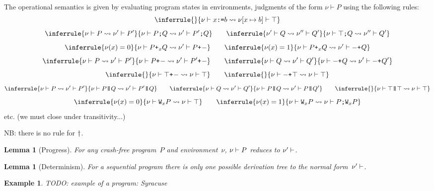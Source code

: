 \documentclass[a4paper]{article}
\theoremstyle{theorem}
\newtheorem{lemma}[theorem]{Lemma}
\theoremstyle{example}
\newtheorem{example}[theorem]{Example}
\theoremstyle{remark}
\begin{document}
The operational semantics is given by evaluating program states in environments,
\ie judgments of the form $\nu\vdash P$ using the following rules:
\[
  \inferrule{\null}{\penv{\nu}{\pset xb}\redto\penv{\nu[x\mapsto b]}{\pskip}}
\]
\[
  \inferrule{\penv\nu P\redto\penv{\nu'}{P'}}{\penv{\nu}{\pseq PQ}\redto\penv{\nu'}{\pseq{P'}{Q}}}
  \qquad
  \inferrule{\penv{\nu'}{Q}\redto\penv{\nu''}{Q'}}{\penv{\nu}{\pseq \pskip Q}\redto\penv{\nu''}{Q'}}
\]
\[
  \inferrule{\nu(x)=\Bfalse}{\penv{\nu}{\por xPQ}\redto\penv{\nu'}{\porl P}}
  \qquad
  \inferrule{\nu(x)=\Btrue}{\penv{\nu}{\por xPQ}\redto\penv{\nu'}{\porr Q}}
\]
\[
  \inferrule{\penv\nu P\redto\penv{\nu'}{P'}}{\penv{\nu}{\porl P}\redto\penv{\nu'}{\porl{P'}}}
  \qquad
  \inferrule{\penv\nu Q\redto\penv{\nu'}{Q'}}{\penv{\nu}{\porr Q}\redto\penv{\nu'}{\porr{Q'}}}
\]
\[
  \inferrule{\null}{\penv{\nu}{\porl\pskip}\redto\penv{\nu}{\pskip}}
  \qquad
  \inferrule{\null}{\penv{\nu}{\porr\pskip}\redto\penv{\nu}{\pskip}}
\]
\[
  \inferrule{\penv\nu P\redto\penv{\nu'}{P'}}{\penv{\nu}{\ppar PQ}\redto\penv{\nu'}{\ppar{P'}{Q}}}
  \qquad
  \inferrule{\penv\nu Q\redto\penv{\nu'}{Q'}}{\penv{\nu}{\ppar PQ}\redto\penv{\nu'}{\ppar{P}{Q'}}}
  \qquad
  \inferrule{\null}{\penv\nu{\ppar\pskip\pskip}\redto\penv\nu\pskip}
\]
\[
  \inferrule{\nu(x)=\Bfalse}{\penv\nu{\pwhile xP}\redto\penv\nu\pskip}
  \qquad
  \inferrule{\nu(x)=\Btrue}{\penv\nu{\pwhile xP}\redto\penv\nu{\pseq{P}{\pwhile xP}}}
\]
etc. (we must close under transitivity...)

NB: there is no rule for $\dagger$.

\begin{lemma}[Progress]
  For any crash-free program~$P$ and environment~$\nu$, $\nu\vdash P$ reduces to
  $\nu'\vdash$.
\end{lemma}

\begin{lemma}[Determinism]
  For a sequential program there is only one possible derivation tree to the
  normal form~$\nu'\vdash$.
\end{lemma}

\begin{example}
  TODO: example of a program: Syracuse
\end{example}
\end{document}
